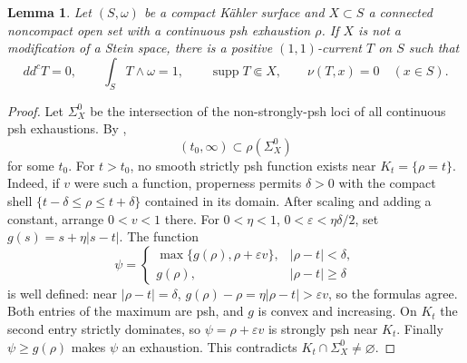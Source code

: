 \documentclass[11pt]{amsart}
\newtheorem{lemma}[theorem]{Lemma}
\theoremstyle{definition}
\theoremstyle{remark}
\numberwithin{equation}{section}
\newcommand{\ddc}{dd^c}
\newcommand{\supp}{\operatorname{supp}}
\begin{document}
\begin{lemma}\label{lem:level-averaging}
Let $(S,\omega)$ be a compact K\"ahler surface and $X\subset S$
a connected noncompact open set with a continuous psh exhaustion
$\rho$. If $X$ is not a modification of a Stein space, there is
a positive $(1,1)$-current $T$ on $S$ such that
\begin{equation}\label{eq:averaged-current-properties}
 \ddc T=0,\qquad \int_S T\wedge\omega=1,\qquad
 \supp T\Subset X,\qquad \nu(T,x)=0\quad(x\in S).
\end{equation}
\end{lemma}
\begin{proof}
Let $\Sigma_X^0$ be the intersection of the non-strongly-psh loci
of all continuous psh exhaustions. By
\cite[Lemma~2.1]{MongodiSlodkowski2020},
\begin{equation}\label{eq:kernel-halfline}
 (t_0,\infty)\subset\rho(\Sigma_X^0)
\end{equation}
for some $t_0$. For $t>t_0$, no smooth strictly psh function exists
near $K_t=\{\rho=t\}$. Indeed, if $v$ were such a function,
properness permits $\delta>0$ with the compact shell
$\{t-\delta\le\rho\le t+\delta\}$ contained in its domain.
After scaling and adding a constant, arrange $0<v<1$ there. For
$0<\eta<1$, $0<\varepsilon<\eta\delta/2$, set
$g(s)=s+\eta|s-t|$. The function
\[
 \psi=
 \begin{cases}
 \max\{g(\rho),\rho+\varepsilon v\},& |\rho-t|<\delta,\\
 g(\rho),& |\rho-t|\ge\delta
 \end{cases}
\]
is well defined: near $|\rho-t|=\delta$,
$g(\rho)-\rho=\eta|\rho-t|>\varepsilon v$, so the formulas agree.
Both entries of the maximum are psh, and $g$ is convex and
increasing. On $K_t$ the second entry strictly dominates, so
$\psi=\rho+\varepsilon v$ is strongly psh near $K_t$.
Finally $\psi\ge g(\rho)$ makes $\psi$ an exhaustion. This
contradicts $K_t\cap\Sigma_X^0\ne\varnothing$.


\end{proof}
\end{document}
